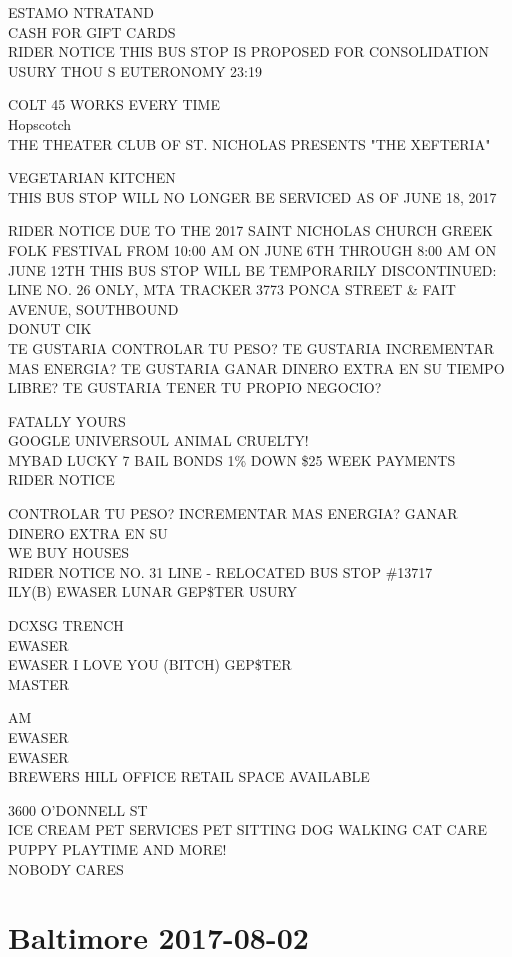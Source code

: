 \documentclass[10pt,letterpaper]{article}
\begin{document}
ESTAMO NTRATAND\\
CASH FOR GIFT CARDS\\
RIDER NOTICE THIS BUS STOP IS PROPOSED FOR CONSOLIDATION\\
USURY THOU S EUTERONOMY 23:19

COLT 45 WORKS EVERY TIME\\
Hopscotch\\
THE THEATER CLUB OF ST. NICHOLAS PRESENTS "THE XEFTERIA"

VEGETARIAN KITCHEN\\
THIS BUS STOP WILL NO LONGER BE SERVICED AS OF JUNE 18, 2017

RIDER NOTICE DUE TO THE 2017 SAINT NICHOLAS CHURCH GREEK FOLK FESTIVAL FROM 10:00 AM ON JUNE 6TH THROUGH 8:00 AM ON JUNE 12TH THIS BUS STOP WILL BE TEMPORARILY DISCONTINUED: LINE NO. 26 ONLY, MTA TRACKER 3773 PONCA STREET \& FAIT AVENUE, SOUTHBOUND\\
DONUT CIK\\
TE GUSTARIA CONTROLAR TU PESO?  TE GUSTARIA INCREMENTAR MAS ENERGIA?  TE GUSTARIA GANAR DINERO EXTRA EN SU TIEMPO LIBRE?  TE GUSTARIA TENER TU PROPIO NEGOCIO?

FATALLY YOURS\\
GOOGLE UNIVERSOUL ANIMAL CRUELTY!\\
MYBAD LUCKY 7 BAIL BONDS 1\% DOWN \$25 WEEK PAYMENTS\\
RIDER NOTICE

CONTROLAR TU PESO? INCREMENTAR MAS ENERGIA? GANAR DINERO EXTRA EN SU\\
WE BUY HOUSES\\
RIDER NOTICE NO. 31 LINE {-} RELOCATED BUS STOP \#13717\\
ILY(B) EWASER LUNAR GEP\$TER USURY

DCXSG TRENCH\\
EWASER\\
EWASER I LOVE YOU (BITCH) GEP\$TER\\
MASTER

AM\\
EWASER\\
EWASER\\
BREWERS HILL OFFICE RETAIL SPACE AVAILABLE

3600 O'DONNELL ST\\
ICE CREAM PET SERVICES PET SITTING DOG WALKING CAT CARE PUPPY PLAYTIME AND MORE!\\
NOBODY CARES


\section*{Baltimore 2017-08-02}
\end{document}
